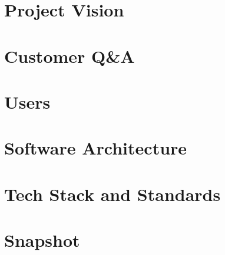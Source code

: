 \documentclass[12pt]{article}
\begin{document}
\section{Project Vision}

\section{Customer Q\&A}

\section{Users}

\section{Software Architecture}

\section{Tech Stack and Standards}

\section{Snapshot}
\end{document}
